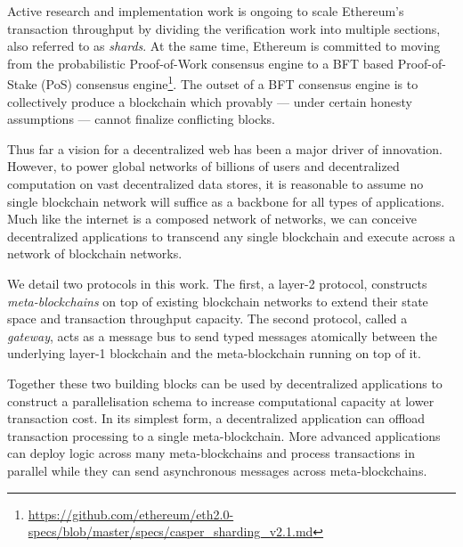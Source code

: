 \documentclass[12pt,a4paper]{article}
\begin{document}
Active research and implementation work is ongoing to scale Ethereum's transaction throughput by dividing the verification work into multiple sections, also referred to as \emph{shards}.
At the same time, Ethereum is committed to moving from the probabilistic Proof-of-Work consensus engine to a BFT based Proof-of-Stake (PoS) consensus engine\footnote{
	\url{https://github.com/ethereum/eth2.0-specs/blob/master/specs/casper_sharding_v2.1.md}
}.
The outset of a BFT consensus engine is to collectively produce a blockchain which provably --- under certain honesty assumptions --- cannot finalize conflicting blocks.



Thus far a vision for a decentralized web has been a major driver of innovation.
However, to power global networks of billions of users and decentralized computation on vast decentralized data stores, it is reasonable to assume no single blockchain network will suffice as a backbone for all types of applications.
Much like the internet is a composed network of networks, we can conceive decentralized applications to transcend any single blockchain and execute across a network of blockchain networks.

We detail two protocols in this work.
The first, a layer-2 protocol, constructs \emph{meta-blockchains} on top of existing blockchain networks to extend their state space and transaction throughput capacity.
The second protocol, called a \emph{gateway}, acts as a message bus to send typed messages atomically between the underlying layer-1 blockchain and the meta-blockchain running on top of it.

Together these two building blocks can be used by decentralized applications to construct a parallelisation schema to increase %
computational capacity at lower transaction cost.
In its simplest form, a decentralized application can offload transaction processing to a single meta-blockchain.
More advanced applications can deploy logic across many meta-blockchains and process transactions in parallel while they can send asynchronous messages across meta-blockchains.
\end{document}
